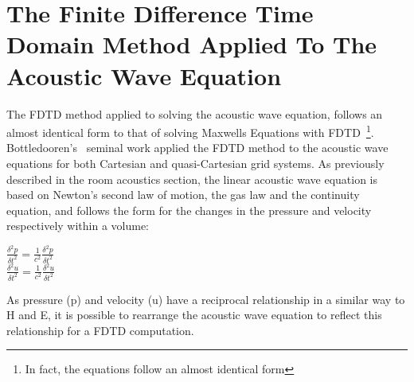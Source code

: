 \section{The Finite Difference Time Domain Method Applied To The Acoustic Wave Equation}
The FDTD method applied to solving the acoustic wave equation, follows an almost identical form to that of solving Maxwells Equations with FDTD~\cite{Scheirman2015}\footnote{In fact, the equations follow an almost identical form}. Bottledooren's~\cite{Botteldooren1993} seminal work applied the FDTD method to the acoustic wave equations for both Cartesian and quasi-Cartesian grid systems. As previously described in the room acoustics section, the linear acoustic wave equation is based on Newton's second law of motion, the gas law and the continuity equation, and follows the form for the changes in the pressure and velocity respectively within a volume:\\
\begin{center}
$\frac{\delta^2 p}{\delta t^2} = \frac{1}{c^2} \frac{\delta^2 p}{\delta t^2}$\\
$\frac{\delta^2 u}{\delta t^2} = \frac{1}{c^2} \frac{\delta^2 u}{\delta t^2}$\\
\end{center}
As pressure (p) and velocity (u) have a reciprocal relationship in a similar way to H and E, it is possible to rearrange the acoustic wave equation to reflect this relationship for a FDTD computation.
